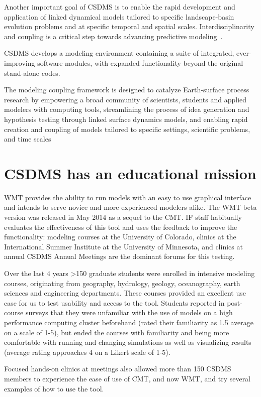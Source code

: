 \documentclass[11pt, oneside]{amsart}
\begin{document}
Another important goal of CSDMS is to enable the rapid development and application of linked dynamical models tailored to specific landscape-basin evolution problems and at specific temporal and spatial scales. Interdisciplinarity and coupling is a critical step towards advancing predictive modeling~\cite{voinov2010community}.

CSDMS develops a modeling environment containing a suite of integrated, ever-improving software modules, with expanded functionality beyond the original stand-alone codes. 

The modeling coupling framework is designed to catalyze Earth-surface process research by empowering a broad community of scientists, students and applied modelers with computing tools, streamlining the process of idea generation and hypothesis testing through linked surface dynamics models, and enabling rapid creation and coupling of models tailored to specific settings, scientific problems, and time scales

\section{CSDMS has an educational mission}

WMT provides the ability to run models with an easy to use graphical interface and intends to serve novice and more experienced modelers alike. The WMT beta version was released in May 2014  as a sequel to the CMT.   IF staff habitually evaluates the effectiveness of this tool and uses the feedback to improve the functionality: modeling courses at the University of Colorado, clinics at the International Summer Institute at the University of Minnesota, and clinics at annual CSDMS Annual Meetings are the dominant forums for this testing. 

Over the last 4 years >150 graduate students were enrolled in intensive modeling courses, originating from geography, hydrology, geology, oceanography, earth sciences and engineering departments. These courses provided an excellent use case for us to test usability and access to the tool. Students reported in post-course surveys that they were unfamiliar with the use of models on a high performance computing cluster beforehand (rated their familiarity as 1.5 average on a scale of 1-5), but ended the courses with familiarity and being more comfortable with running and changing simulations as well as visualizing results (average rating approaches 4 on a Likert scale of 1-5). 

Focused hands-on clinics at meetings also allowed more than 150 CSDMS members to experience the ease of use of CMT, and now WMT, and try several examples of how to use the tool. 
\end{document}
